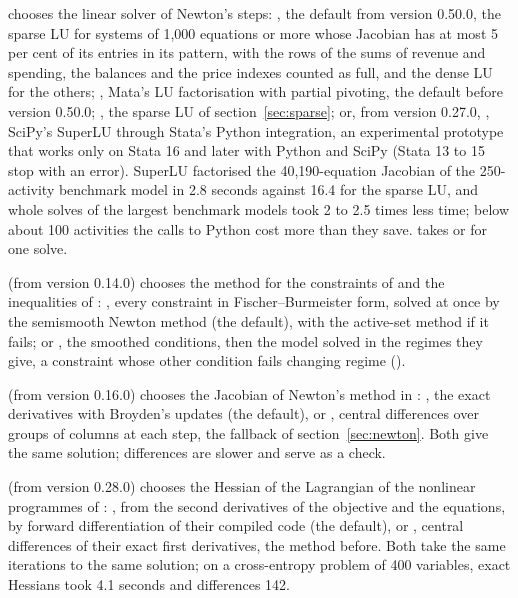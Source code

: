\begin{optdesc}
\item[\optarg{lin}{solver}{dense|sparse|auto|python}] chooses the linear solver of
Newton's steps: , the default from version 0.50.0, the sparse LU
for systems of 1,000 equations or more whose Jacobian has at most 5 per cent
of its entries in its pattern, with the rows of the sums of revenue and
spending, the balances and the price indexes counted as full, and the dense
LU for the others; , Mata's LU factorisation with partial
pivoting, the default before version 0.50.0; , the sparse LU of
section~\ref{sec:sparse}; or, from version 0.27.0, , SciPy's SuperLU
through Stata's Python integration, an experimental prototype that works
only on Stata 16 and later with Python and SciPy (Stata 13 to 15 stop with
an error). SuperLU factorised the 40,190-equation Jacobian of the
250-activity benchmark model in 2.8 seconds against 16.4 for the sparse LU,
and whole solves of the largest benchmark models took 2 to 2.5 times less
time; below about 100 activities the calls to Python cost more than they
save.  takes  or  for one
solve.

\item[\optarg{}{mcp}{semismooth|activeset}] (from version 0.14.0) chooses the
method for the constraints of  and the inequalities of
: , every constraint in
Fischer--Burmeister form, solved at once by the semismooth Newton method (the
default), with the active-set method if it fails; or , the
smoothed conditions, then the model solved in the regimes they give, a
constraint whose other condition fails changing regime
().

\item[\optarg{jac}{obian}{exact|differences}] (from version 0.16.0) chooses
the Jacobian of Newton's method in : , the exact
derivatives with Broyden's updates (the default), or ,
central differences over groups of columns at each step, the fallback of
section~\ref{sec:newton}. Both give the same solution; differences are slower
and serve as a check.

\item[\optarg{hes}{sian}{exact|differences}] (from version 0.28.0) chooses
the Hessian of the Lagrangian of the nonlinear programmes of
: , from the second derivatives of the
objective and the equations, by forward differentiation of their compiled
code (the default), or , central differences of their exact
first derivatives, the method before. Both take the same iterations to the
same solution; on a cross-entropy problem of 400 variables, exact Hessians
took 4.1 seconds and differences 142.


\end{optdesc}
